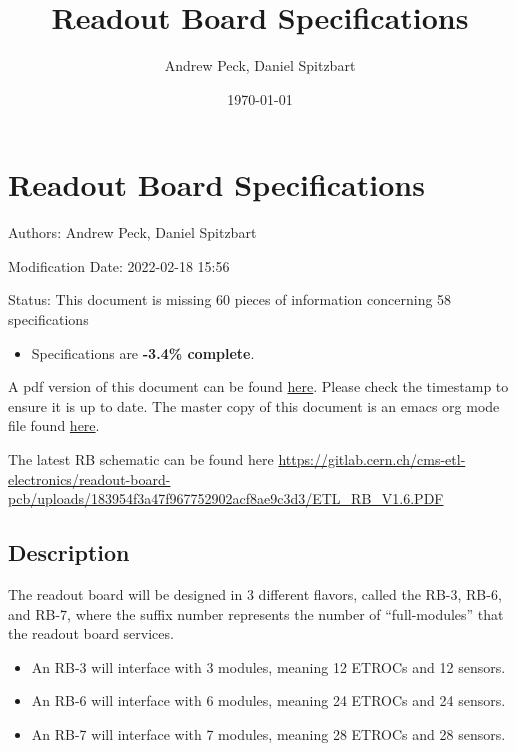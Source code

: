 \documentclass[11pt]{article}
\author{Andrew Peck, Daniel Spitzbart}
\date{\today}
\title{Readout Board Specifications}
\begin{document}
\maketitle

\section{Readout Board Specifications}
\label{sec:orge4fdbab}

Authors: Andrew Peck, Daniel Spitzbart

Modification Date: 2022-02-18 15:56

Status: This document is missing 60 pieces of information concerning  58 specifications
\begin{itemize}
\item Specifications are \textbf{-3.4\% complete}.
\end{itemize}

A pdf version of this document can be found \href{./rb-specs.pdf}{here}. Please check the timestamp to ensure it is up to date. The master copy of this document is an emacs org mode file found \href{https://gitlab.cern.ch/cms-etl-electronics/readout-board-docs/-/blob/master/docs/Specifications/rb-specs.org}{here}.

The latest RB schematic can be found here \url{https://gitlab.cern.ch/cms-etl-electronics/readout-board-pcb/uploads/183954f3a47f967752902acf8ae9c3d3/ETL\_RB\_V1.6.PDF}

\setcounter{tocdepth}{3}
\tableofcontents

\subsection{Description}
\label{sec:orge5c745c}

The readout board will be designed in 3 different flavors, called the RB-3, RB-6, and RB-7, where the suffix number represents the number of ``full-modules'' that the readout board services.

\begin{itemize}
\item An RB-3 will interface with 3 modules, meaning 12 ETROCs and 12 sensors.
\item An RB-6 will interface with 6 modules, meaning 24 ETROCs and 24 sensors.
\item An RB-7 will interface with 7 modules, meaning 28 ETROCs and 28 sensors.
\end{itemize}
\end{document}
